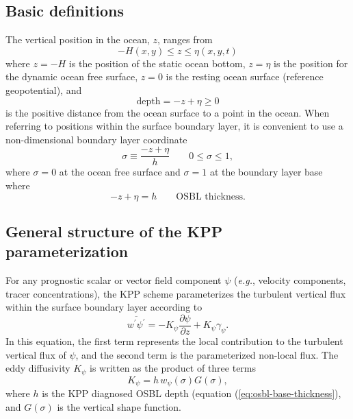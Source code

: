 \documentclass[preprint,12pt,authoryear]{agujournal}
\begin{document}
\subsection{Basic definitions}

The vertical position in the ocean, $z$, ranges from 
\begin{equation}
-H(x,y) \le z \le \eta(x,y,t)
\end{equation}
where $z=-H$ is the position of the static ocean bottom, $z=\eta$ is the position for the dynamic ocean free surface, $z=0$ is the resting ocean surface (reference geopotential), and
 \begin{equation}
  \mbox{depth} = -z + \eta \ge 0 
 \end{equation}
is the positive distance from the ocean surface to a point in the ocean. When referring to positions within the surface boundary layer, it is convenient to use a non-dimensional boundary layer coordinate
\begin{equation}
\label{sigDefn}
\sigma \equiv \frac{-z + \eta}{h} 
\qquad 0 \le \sigma \le 1,
\end{equation}
where $\sigma=0$ at the ocean free surface and $\sigma=1$ at the boundary layer base where 
\begin{equation}
 -z + \eta = h  \qquad \mbox{OSBL thickness}.
\label{eq:osbl-base-thickness}
\end{equation}

\subsection{General structure of the KPP parameterization}

For any prognostic scalar or vector field component $\psi$ (\textit{e.g.}, velocity components, tracer concentrations), the KPP scheme parameterizes the turbulent vertical flux within the surface boundary layer according to 
\begin{equation}
\label{KPPfluxText}
\overline{w^\prime \psi^\prime} = -K_\psi \frac{\partial \psi}{\partial z} + K_\psi \gamma_\psi.
\end{equation}
In this equation, the first term represents the local contribution to the turbulent vertical flux of $\psi$, and the second term is the parameterized non-local flux.  The eddy diffusivity $K_\psi$ is written as the product of three terms
\begin{equation}
\label{KPPDiffusivityText}
K_\psi = h\, w_\psi \left(\sigma\right)G\left(\sigma \right),
\end{equation}
where $h$ is the KPP diagnosed OSBL depth (equation (\ref{eq:osbl-base-thickness}), and $G(\sigma)$ is the vertical shape function.
\end{document}
